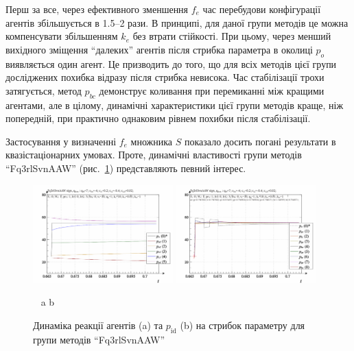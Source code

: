 Перш за все, через ефективного зменшення
$ f_e $ час перебудови конфігурації агентів збільшується в 1.5--2
рази. В принципі, для даної групи методів це можна компенсувати
збільшенням
$ k_e $ без втрати стійкості. При цьому, через менший вихідного
зміщення ``далеких'' агентів після стрибка параметра в околиці
$ p_o $ виявляється один агент. Це призводить до того, що для всіх
методів цієї групи досліджених похибка відразу після стрибка
невисока. Час стабілізації трохи затягується, метод
$ p_{bc} $ демонструє коливання при перемиканні між кращими
агентами, але в цілому, динамічні характеристики цієї групи
методів краще, ніж попередній, при практично однаковим рівнем
похибки після стабілізації.

Застосування у визначенні
$ f_e $ множника
$ S $ показало досить погані результати в квазістаціонарних
умовах. Проте, динамічні властивості групи методів ``Fq3rlSvnAAW''
(рис.~\ref{atu:f:Fq3rlSvnAAW_sign}) представляють певний інтерес.

\begin{figure}[htb!]
  \begin{center}
    \includegraphics[width=0.48\textwidth]{p/sign/qls-p_t_pi_m_Fq3rlSvnAAW_sign.png}
    \hfill
    \includegraphics[width=0.48\textwidth]{p/sign/qls-p_t_p_m_Fq3rlSvnAAW_sign.png}
  \end{center}
  \vspace{-1.0ex}
  \begin{center}
    ~ \hfill a \hfill\hfill b  \hfill ~
  \end{center}
  \vspace{-1.5ex}
  \caption{Динаміка реакції агентів (a) та $p_\mathrm{id}$ (b) на стрибок параметру для групи методів ``Fq3rlSvnAAW''}
  \label{atu:f:Fq3rlSvnAAW_sign}
\end{figure}

